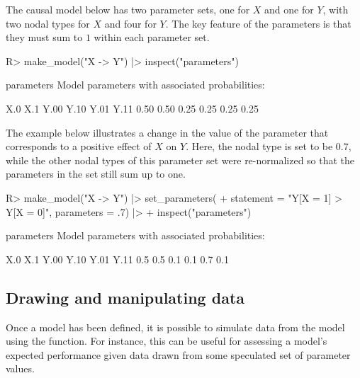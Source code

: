 \documentclass[
  11pt,
  article]{jss}
\renewcommand{\texttt}[1]{\code{#1}}
\begin{document}
The causal model below has two parameter sets, one for \(X\) and one for
\(Y\), with two nodal types for \(X\) and four for \(Y\). The key
feature of the parameters is that they must sum to \(1\) within each
parameter set.

\begin{CodeChunk}
\begin{CodeInput}
R> make_model("X -> Y") |> inspect("parameters")
\end{CodeInput}

\begin{CodeOutput}

parameters
Model parameters with associated probabilities: 

 X.0  X.1 Y.00 Y.10 Y.01 Y.11 
0.50 0.50 0.25 0.25 0.25 0.25 
\end{CodeOutput}
\end{CodeChunk}

The example below illustrates a change in the value of the parameter
that corresponds to a positive effect of \(X\) on \(Y\). Here, the nodal
type \texttt{Y.Y01} is set to be \(0.7\), while the other nodal types of
this parameter set were re-normalized so that the parameters in the set
still sum up to one.

\begin{CodeChunk}
\begin{CodeInput}
R> make_model("X -> Y") |> set_parameters(
+    statement = "Y[X = 1] > Y[X = 0]", parameters = .7) |>
+    inspect("parameters")
\end{CodeInput}

\begin{CodeOutput}

parameters
Model parameters with associated probabilities: 

 X.0  X.1 Y.00 Y.10 Y.01 Y.11 
 0.5  0.5  0.1  0.1  0.7  0.1 
\end{CodeOutput}
\end{CodeChunk}

\subsection{Drawing and manipulating
data}\label{drawing-and-manipulating-data}

Once a model has been defined, it is possible to simulate data from the
model using the \texttt{make\_data()} function. For instance, this can
be useful for assessing a model's expected performance given data drawn
from some speculated set of parameter values.
\end{document}
